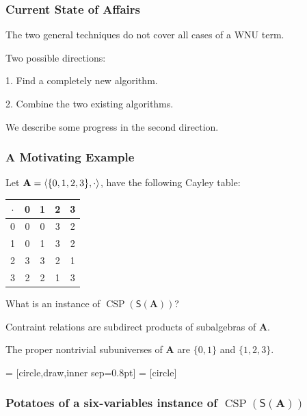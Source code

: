 \documentclass[10pt,xcolor=dvipsnames%
   ]{beamer}
\DeclareMathOperator{\CSP}{CSP}
\renewcommand{\.}{\cdot}
\newcommand{\sansS}{\ensuremath{\mathsf{S}}}
\newcommand{\bA}{\ensuremath{\mathbf{A}}}
\begin{document}
\begin{frame}
\frametitle{Current State of Affairs}
The two general techniques do not cover all cases of a WNU term. 

\medskip
Two possible directions:

1. Find a completely new algorithm.

2. Combine the two existing algorithms.

We describe some progress in the second direction.
\end{frame}


\begin{frame}
\frametitle{A Motivating Example}
Let $\bA = \<\{0,1,2,3\}, \cdot \>$, have the following Cayley table:

\begin{center}
 \begin{tabular}{c|cccc}
      $\cdot $ & 0 & 1 & 2 & 3\\
      \hline
      0 & 0 & 0 & 3& 2\\
      1 & 0 & 1 & 3& 2\\
      2 & 3 & 3 & 2 & 1\\
      3 & 2 & 2 & 1 & 3
 \end{tabular}
\end{center}

What is an instance of $\CSP(\sansS(\bA))$?

Contraint relations are subdirect products of subalgebras of $\bA$.

The proper nontrivial subuniverses of $\bA$ are $\{0,1\}$ and $\{1,2,3\}$.

\end{frame}

\begin{frame}
  \newcommand{\bS}{\ensuremath{\mathbf{S}}}
  \newcommand{\bSq}{\ensuremath{\mathbf{Sq}}}


   = [circle,draw,inner sep=0.8pt]
   = [circle]
  \frametitle{Potatoes of a six-variables instance of $\CSP(\sansS (\bA))$}
  \begin{center}
  \end{center}

\end{frame}
\end{document}
